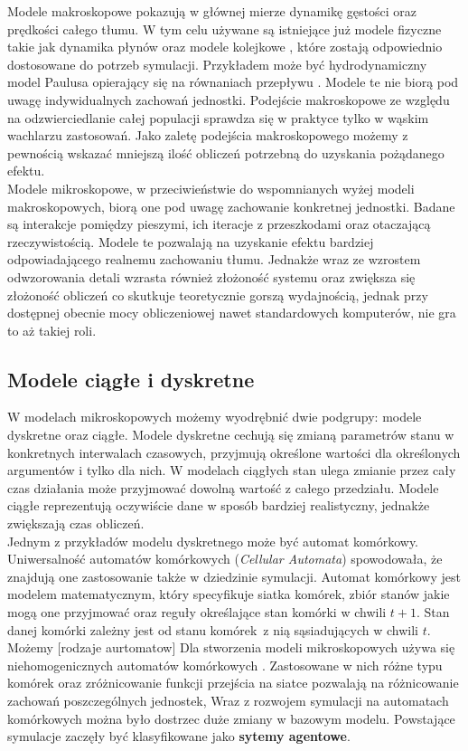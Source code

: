 Modele makroskopowe pokazują w głównej mierze dynamikę gęstości oraz prędkości całego tłumu. W tym celu używane są istniejące już modele fizyczne takie jak dynamika płynów oraz modele kolejkowe \cite{relativeVelocity}, które zostają odpowiednio dostosowane do potrzeb symulacji. Przykładem może być hydrodynamiczny model Paulusa opierający się na równaniach przepływu \cite{ArchitekturaModelowania}. Modele te nie biorą pod uwagę indywidualnych zachowań jednostki. Podejście makroskopowe ze względu na odzwierciedlanie całej populacji sprawdza się w praktyce tylko w wąskim wachlarzu zastosowań. Jako zaletę podejścia makroskopowego możemy z pewnością wskazać mniejszą ilość obliczeń potrzebną do uzyskania pożądanego efektu. \\
Modele mikroskopowe, w przeciwieństwie do wspomnianych wyżej modeli makroskopowych, biorą one pod uwagę zachowanie konkretnej jednostki. Badane są interakcje pomiędzy pieszymi, ich iteracje z przeszkodami oraz otaczającą rzeczywistością. Modele te pozwalają na uzyskanie efektu bardziej odpowiadającego realnemu zachowaniu tłumu. Jednakże wraz ze wzrostem odwzorowania detali wzrasta również złożoność systemu oraz zwiększa się złożoność obliczeń co skutkuje teoretycznie gorszą wydajnością, jednak przy dostępnej obecnie mocy obliczeniowej nawet standardowych komputerów, nie gra to aż takiej roli.

\subsection{Modele ciągłe i dyskretne}

W modelach mikroskopowych możemy wyodrębnić dwie podgrupy: modele dyskretne oraz ciągłe. Modele dyskretne cechują się zmianą parametrów stanu w konkretnych interwalach czasowych, przyjmują określone wartości dla określonych argumentów i tylko dla nich. W modelach ciągłych stan ulega zmianie przez cały czas działania może przyjmować dowolną wartość z całego przedziału. Modele ciągłe reprezentują oczywiście dane w sposób bardziej realistyczny, jednakże zwiększają czas obliczeń. \\

Jednym z przykładów modelu dyskretnego może być automat komórkowy. Uniwersalność automatów komórkowych (\textit{Cellular Automata}) spowodowała, że znajdują one zastosowanie także w dziedzinie symulacji. Automat komórkowy jest modelem matematycznym, który specyfikuje siatka komórek, zbiór stanów jakie mogą one przyjmować oraz reguły określające stan komórki w chwili $t + 1$. Stan danej komórki zależny jest od stanu komórek~z nią sąsiadujących w chwili $t$. Możemy [rodzaje aurtomatow] Dla stworzenia modeli mikroskopowych używa się niehomogenicznych automatów komórkowych \cite{modelowanieDynamikiTlumu}. Zastosowane w nich różne typu komórek oraz zróżnicowanie funkcji przejścia na siatce pozwalają na różnicowanie zachowań poszczególnych jednostek, Wraz z rozwojem symulacji na automatach komórkowych można było dostrzec duże zmiany w bazowym modelu. Powstające symulacje zaczęły być klasyfikowane jako \textbf{sytemy agentowe}.

